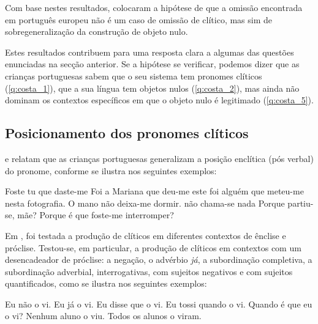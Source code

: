 \documentclass[output=paper]{LSP/langsci}
\begin{document}
Com base nestes resultados, \citet{costalobo2009} colocaram a hipótese de que a omissão encontrada em português europeu não é um caso de omissão de clítico, mas sim de sobregeneralização da construção de objeto nulo.

Estes resultados contribuem para uma resposta clara a algumas das questões enunciadas na secção anterior. Se a hipótese se verificar, podemos dizer que as crianças portuguesas sabem que o seu sistema tem pronomes clíticos (\ref{q:costa_1}), que a sua língua tem objetos nulos (\ref{q:costa_2}), mas ainda não dominam os contextos específicos em que o objeto nulo é legitimado (\ref{q:costa_5}).

\subsection{Posicionamento dos pronomes clíticos}
\label{subsec:costa_posicionamento}

\citet{duarte_etal1995}  e \citet{duartematos2000} relatam que as crianças portuguesas generalizam a posição enclítica (pós verbal) do pronome, conforme se ilustra nos seguintes exemplos:

\ea\label{ex:costa_35}
\ea\label{ex:costa_35a} Foste tu que daste-me  
\ex\label{ex:costa_35b} Foi a Mariana que deu-me este 
\ex\label{ex:costa_35c} foi alguém que meteu-me nesta fotografia. 
\ex\label{ex:costa_35d} O mano não deixa-me dormir.
\ex\label{ex:costa_35e} não chama-se nada
\ex\label{ex:costa_35f} Porque partiu-se, mãe?
\ex\label{ex:costa_35g} Porque é que foste-me interromper?
\zl

Em \citet{costa_etal2014}, foi testada a produção de clíticos em diferentes contextos de ênclise e próclise. Testou-se, em particular, a produção de clíticos em contextos com um desencadeador de próclise: a negação, o advérbio \textit{já}, a subordinação completiva, a subordinação adverbial, interrogativas, com sujeitos negativos e com sujeitos quantificados, como se ilustra nos seguintes exemplos:

\ea\label{ex:costa_36}
\ea\label{ex:costa_36a} Eu não o vi.
\ex\label{ex:costa_36b} Eu já o vi.
\ex\label{ex:costa_36c} Eu disse que o vi.
\ex\label{ex:costa_36d} Eu tossi quando o vi.
\ex\label{ex:costa_36e} Quando é que eu o vi?
\ex\label{ex:costa_36f} Nenhum aluno o viu.
\ex\label{ex:costa_36g} Todos os alunos o viram.
\zl
\end{document}
